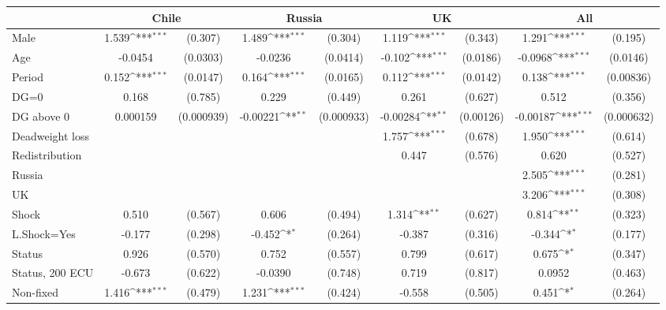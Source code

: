 {
\def\sym#1{\ifmmode^{#1}\else\(^{#1}\)\fi}
\begin{tabular}{l*{4}{cc}}
\hline\hline
                &\multicolumn{2}{c}{Chile}   &\multicolumn{2}{c}{Russia}  &\multicolumn{2}{c}{UK}      &\multicolumn{2}{c}{All}     \\
\hline
Male            &    1.539\sym{***}&  (0.307)&    1.489\sym{***}&  (0.304)&    1.119\sym{***}&  (0.343)&    1.291\sym{***}&  (0.195)\\
Age             &  -0.0454         & (0.0303)&  -0.0236         & (0.0414)&   -0.102\sym{***}& (0.0186)&  -0.0968\sym{***}& (0.0146)\\
Period          &    0.152\sym{***}& (0.0147)&    0.164\sym{***}& (0.0165)&    0.112\sym{***}& (0.0142)&    0.138\sym{***}&(0.00836)\\
DG=0            &    0.168         &  (0.785)&    0.229         &  (0.449)&    0.261         &  (0.627)&    0.512         &  (0.356)\\
DG above 0      & 0.000159         &(0.000939)& -0.00221\sym{**} &(0.000933)& -0.00284\sym{**} &(0.00126)& -0.00187\sym{***}&(0.000632)\\
Deadweight loss &                  &         &                  &         &    1.757\sym{***}&  (0.678)&    1.950\sym{***}&  (0.614)\\
Redistribution  &                  &         &                  &         &    0.447         &  (0.576)&    0.620         &  (0.527)\\
Russia          &                  &         &                  &         &                  &         &    2.505\sym{***}&  (0.281)\\
UK              &                  &         &                  &         &                  &         &    3.206\sym{***}&  (0.308)\\
Shock           &    0.510         &  (0.567)&    0.606         &  (0.494)&    1.314\sym{**} &  (0.627)&    0.814\sym{**} &  (0.323)\\
L.Shock=Yes     &   -0.177         &  (0.298)&   -0.452\sym{*}  &  (0.264)&   -0.387         &  (0.316)&   -0.344\sym{*}  &  (0.177)\\
Status          &    0.926         &  (0.570)&    0.752         &  (0.557)&    0.799         &  (0.617)&    0.675\sym{*}  &  (0.347)\\
Status, 200 ECU &   -0.673         &  (0.622)&  -0.0390         &  (0.748)&    0.719         &  (0.817)&   0.0952         &  (0.463)\\
Non-fixed       &    1.416\sym{***}&  (0.479)&    1.231\sym{***}&  (0.424)&   -0.558         &  (0.505)&    0.451\sym{*}  &  (0.264)\\

\end{tabular}}
